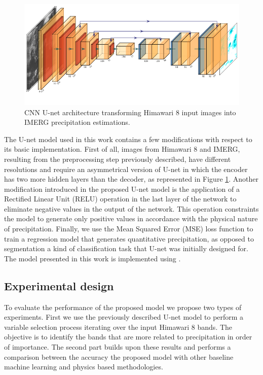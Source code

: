 \documentclass[3p,times]{elsarticle}
\begin{document}
\begin{figure}%
    \includegraphics[width=14cm]{unet.png}
    \caption{CNN U-net architecture transforming Himawari 8 input images into IMERG precipitation estimations.}%
    \label{model_cmp}%
\end{figure}

The U-net model used in this work contains a few modifications with respect to its basic implementation. First of all, images from Himawari 8 and IMERG, resulting from the preprocessing step previously described, have different resolutions and require an asymmetrical version of U-net in which the encoder has two more hidden layers than the decoder, as represented in Figure \ref{model_cmp}. Another modification introduced in the proposed U-net model is the application of a Rectified Linear Unit (RELU) operation in the last layer of the network to eliminate negative values in the output of the network. This operation constraints the model to generate only positive values in accordance with the physical nature of precipitation. Finally, we use the Mean Squared Error (MSE) loss function to train a regression model that generates quantitative precipitation, as opposed to segmentation a kind of classification task that U-net was initially designed for. The model presented in this work is implemented using \citep{chollet2018keras}.

\subsection{Experimental design}

To evaluate the performance of the proposed model we propose two types of experiments. First we use the previously described U-net model to perform a variable selection process iterating over the input Himawari 8 bands. The objective is to identify the bands that are more related to precipitation in order of importance. The second part builds upon these results and performs a comparison between the accuracy the proposed model with other baseline machine learning and physics based methodologies.
\end{document}
